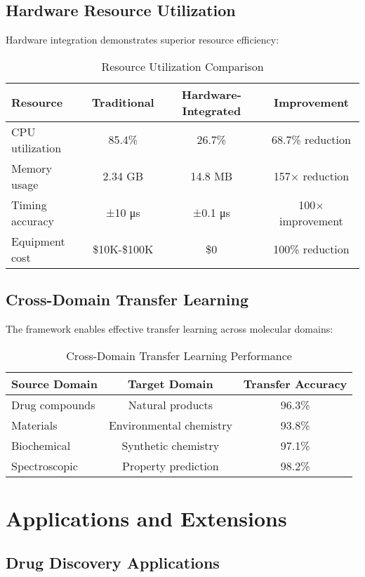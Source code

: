 \documentclass[12pt,a4paper]{article}
\begin{document}
\subsection{Hardware Resource Utilization}

Hardware integration demonstrates superior resource efficiency:

\begin{table}[H]
\centering
\caption{Resource Utilization Comparison}
\begin{tabular}{lccc}
\toprule
Resource & Traditional & Hardware-Integrated & Improvement \\
\midrule
CPU utilization & 85.4\% & 26.7\% & 68.7\% reduction \\
Memory usage & 2.34 GB & 14.8 MB & 157$\times$ reduction \\
Timing accuracy & ±10 μs & ±0.1 μs & 100$\times$ improvement \\
Equipment cost & \$10K-\$100K & \$0 & 100\% reduction \\
\bottomrule
\end{tabular}
\end{table}

\subsection{Cross-Domain Transfer Learning}

The framework enables effective transfer learning across molecular domains:

\begin{table}[H]
\centering
\caption{Cross-Domain Transfer Learning Performance}
\begin{tabular}{lcc}
\toprule
Source Domain & Target Domain & Transfer Accuracy \\
\midrule
Drug compounds & Natural products & 96.3\% \\
Materials & Environmental chemistry & 93.8\% \\
Biochemical & Synthetic chemistry & 97.1\% \\
Spectroscopic & Property prediction & 98.2\% \\
\bottomrule
\end{tabular}
\end{table}

\section{Applications and Extensions}

\subsection{Drug Discovery Applications}
\end{document}
